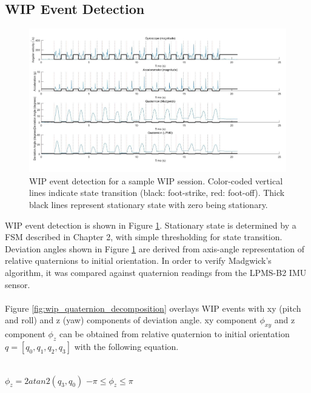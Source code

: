 \subsection{WIP Event Detection}

\begin{figure}[th]
\captionsetup{justification=raggedright,singlelinecheck=false}
\centering
\includegraphics[width=\textwidth,height=\textheight,keepaspectratio]{Figures/wip_event_detection.jpg}
\decoRule
\caption[WIP event detection results]{WIP event detection for a sample WIP session. Color-coded vertical lines indicate state transition (black: foot-strike, red: foot-off). Thick black lines represent stationary state with zero being stationary.}
\label{fig:wip_event_detection}
\end{figure}
\noindent
WIP event detection is shown in Figure \ref{fig:wip_event_detection}. Stationary state is determined by a FSM described in Chapter 2, with simple thresholding for state transition. Deviation angles shown in Figure \ref{fig:wip_event_detection} are derived from axis-angle representation of relative quaternions to initial orientation. In order to verify Madgwick's algorithm, it was compared against quaternion readings from the LPMS-B2 IMU sensor.
\\\\
Figure \ref{fig:wip_quaternion_decomposition} overlays WIP events with xy (pitch and roll) and z (yaw) components of deviation angle. xy component $\phi_{xy}$ and z component $\phi_{z}$ can be obtained from relative quaternion to initial orientation $q = [q_{0},   q_{1},   q_{2},   q_{3}]$ with the following equation.
\\\\
\centerline{$\phi_{z} = 2atan2(q_{3},   q_{0})$ \indent $-\pi\leq \phi_{z}\leq\pi$}
\\\\
